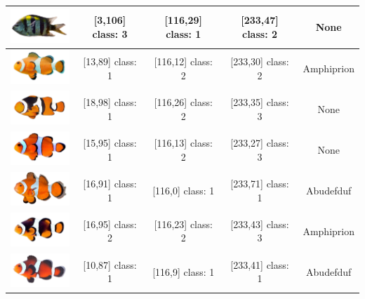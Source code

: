\begin{longtable}{|c|c|c|c|c|}
	\hline
	\includegraphics[width=3cm]{gambar/dataset_validasi/Abudefduf25}
	& [3,106] class: 3 & [116,29] class: 1 & [233,47] class: 2 & None \\
	\hline
	\includegraphics[width=3cm]{gambar/dataset_validasi/Amphiprion01} & [13,89] class: 1 & [116,12] class: 2 & [233,30] class: 2 & Amphiprion \\ \hline
	\includegraphics[width=3cm]{gambar/dataset_validasi/Amphiprion02} & [18,98] class: 1 & [116,26] class: 2 & [233,35] class: 3 & None \\ \hline
	\includegraphics[width=3cm]{gambar/dataset_validasi/Amphiprion03} & [15,95] class: 1 & [116,13] class: 2 & [233,27] class: 3 & None \\ \hline
	\includegraphics[width=3cm]{gambar/dataset_validasi/Amphiprion04} & [16,91] class: 1 & [116,0] class: 1 & [233,71] class: 1 & Abudefduf \\ \hline
	\includegraphics[width=3cm]{gambar/dataset_validasi/Amphiprion05} & [16,95] class: 2 & [116,23] class: 2 & [233,43] class: 3 & Amphiprion \\ \hline
	\includegraphics[width=3cm]{gambar/dataset_validasi/Amphiprion06} & [10,87] class: 1 & [116,9] class: 1 & [233,41] class: 1 & Abudefduf \\ \hline

\end{longtable}
